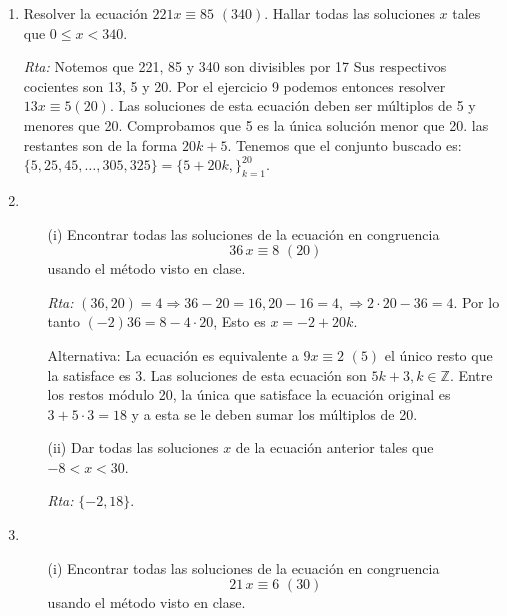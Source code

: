 \documentclass[12pt,spanish,makeidx]{amsbook}
\newcommand{\rta}{\noindent\textit{Rta: }}
\newcommand{\espm}{{\,\,}}
\begin{document}
\begin{enumerate}
\begin{enumerate}
		Como el módulo es par, no hay solución pues el miembro de la derecha es par y el de la izquierda es impar.
		
		\item $2x \equiv -12 (7) $
		
		\rta  $x=1+7k, k\in\mathbb{Z}$.
		
		\item $3x \equiv 5 (4).$
		
		\rta  $x=3+4k, k\in\mathbb{Z}$.
	\end{enumerate}

	\smallskip
	\item Resolver la ecuación $221 x \equiv 85\,\, (340)$. Hallar todas las soluciones $x$ tales que $0 \le x < 340$.
		
	\rta Notemos que 221, 85 y 340 son divisibles por 17 Sus respectivos cocientes son 13, 5 y 20.
	Por el ejercicio 9 podemos entonces resolver $13x\equiv 5 (20)$. Las soluciones de esta ecuación deben ser múltiplos de 5 y menores que 20. Comprobamos que 5 es la única solución menor que 20.
	las restantes son de la forma $20k+5$. Tenemos que el conjunto buscado es: $\{5, 25, 45, \dots,305, 325\}=\{5+20k,\}_{k=1}^{20}$.
	
	\smallskip
	\item 
	\begin{enumerate}
		\item[(i)] Encontrar todas las soluciones de la ecuación en congruencia
		$$36\,x\equiv 8 \espm(20)$$
		usando el método visto en clase.
			
		\rta $(36,20)=4\Rightarrow 36-20=16, 20-16=4, \Rightarrow 2\cdot 20-36=4$.
		Por lo tanto $(-2)36=8-4\cdot 20$, Esto es $x=-2+20k$.
		
		Alternativa: La ecuación es equivalente a $9x\equiv 2 \espm(5)$ el único resto que la satisface es 3.
		Las soluciones de esta ecuación son $5k+3, k\in \mathbb{Z}$. Entre los restos módulo 20, la única que satisface la ecuación original es $3+5\cdot3=18$ y a esta se le deben sumar los múltiplos de 20.
		
		\item[(ii)] Dar todas las soluciones $x$ de la ecuación anterior tales que $-8 < x < 30$.	
		
		\rta  $\{-2, 18\}$.
		
	\end{enumerate}
	
	
	\smallskip
	\item 
	\begin{enumerate}
		\item[(i)] Encontrar todas las soluciones de la ecuación en congruencia
		$$21\,x\equiv 6 \espm(30)$$
		usando el método visto en clase.
			

\end{enumerate}
\end{enumerate}
\end{document}
